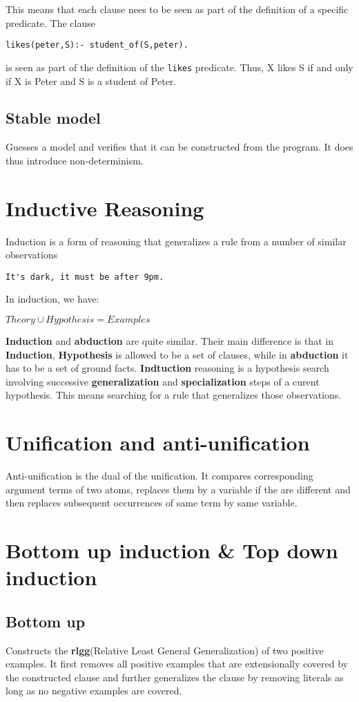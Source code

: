\documentclass[12pt, oneside]{report}
\numberwithin{definition}{chapter}
\numberwithin{theorem}{chapter}
\numberwithin{lemma}{chapter}
\numberwithin{Rule}{chapter}
\numberwithin{equation}{chapter}
\begin{document}
This means that each clause nees to be seen as part of the definition of a specific predicate. The clause 

\begin{verbatim}
likes(peter,S):- student_of(S,peter).
\end{verbatim}
is seen as part of the definition of the \texttt{likes} predicate. Thus, X likes S if and only if X is Peter and S is a student of Peter. 
\subsection{Stable model}
Guesses a model and verifies that it can be constructed from the program. It does thus introduce non-determinism. 


\section{Inductive Reasoning}
Induction is a form of reasoning that generalizes a rule from a number of similar observations
\begin{verbatim}
It's dark, it must be after 9pm.
\end{verbatim}
In induction, we have:
\begin{tcolorbox}
$
Theory \cup Hypothesis = Examples
$
\end{tcolorbox}
\textbf{Induction} and \textbf{abduction} are quite similar. Their main difference is that in \textbf{Induction}, \textbf{Hypothesis} is allowed to be a set of clauses, while in \textbf{abduction} it has to be a set of ground facts. \textbf{Indtuction} reasoning is a hypothesis search involving successive \textbf{generalization} and \textbf{specialization} steps of a curent hypothesis. This means searching for a rule that generalizes those observations.
\section{Unification and anti-unification}
Anti-unification is the dual of the unification. It compares corresponding argument terms of two atoms, replaces them by a variable if the are different and then replaces subsequent occurrences of same term by same variable. 
\section{Bottom up induction \& Top down induction}
\subsection{Bottom up}
Constructs the \textbf{rlgg}(Relative Least General Generalization) of two positive examples.
It first removes all positive examples that are extensionally covered by the constructed clause and further generalizes the clause by removing literals as long as no negative examples are covered.
\end{document}
